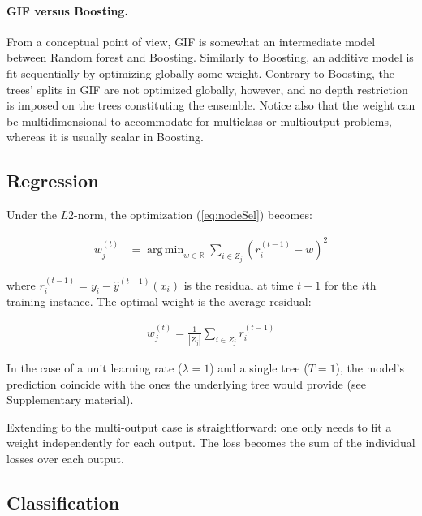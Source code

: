 \documentclass{article}
\DeclareMathOperator*{\argmin}{arg\,min}
\begin{document}
\paragraph{GIF versus Boosting.}
From a conceptual point of view, GIF is somewhat an intermediate model 
between Random forest and Boosting. Similarly to Boosting, an additive model 
is fit sequentially by optimizing globally some weight. Contrary to 
Boosting, the trees' splits in GIF are not optimized globally, however, and no 
depth restriction is imposed on the trees constituting the ensemble. Notice 
also that the weight can be multidimensional to accommodate for multiclass or 
multioutput problems, whereas it is usually scalar in Boosting.


\subsection{Regression}
\label{subsec:regression}

Under the $L2$-norm, the optimization (\ref{eq:nodeSel}) becomes:

\vspace*{-\baselineskip}
\begin{align}\label{eq:L2min}
w_j^{(t)} &=  \argmin_{w \in \mathbb{R}} \sum_{i \in Z_j} \left(r_i^{(t-1)} - 
w\right)^2
\end{align}
\vspace*{-\baselineskip}

where $r_i^{(t-1)} = y_i - \hat{y}^{(t-1)}(x_i)$ is the residual at time $t-1$ 
for the $i$th training instance.
The optimal weight is the average residual:

\vspace*{-\baselineskip}
\begin{align}\label{eq:L2Solution}
w_j^{(t)} = \frac{1}{|Z_j|} \sum_{i \in Z_j} r_i^{(t-1)}
\end{align}
\vspace*{-\baselineskip}

In the case of a unit learning rate ($\lambda = 1$) and a single tree ($T=1$), 
the model's prediction coincide with the ones the underlying tree would provide 
(see Supplementary material).

Extending to the multi-output case is straightforward: one only needs to fit a 
weight independently for each output. The loss becomes the sum of the 
individual losses over each output.

\subsection{Classification}
\label{subsec:classification}
\end{document}
